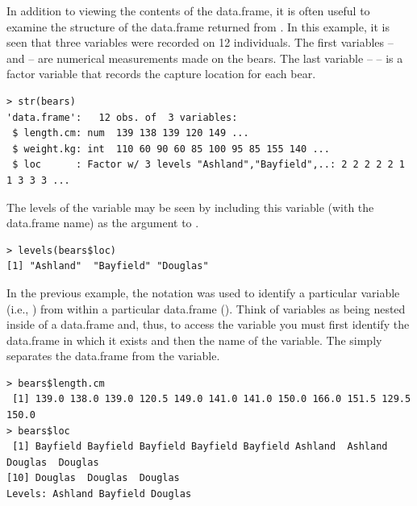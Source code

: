 \documentclass[10pt,openany]{book}\usepackage[]{graphicx}\usepackage[]{color}
\makeatletter
\newenvironment{kframe}{%
 \def\at@end@of@kframe{}%
 \ifinner\ifhmode%
  \def\at@end@of@kframe{\end{minipage}}%
  \begin{minipage}{\columnwidth}%
 \fi\fi%
 \def\FrameCommand##1{\hskip\@totalleftmargin \hskip-\fboxsep
 \colorbox{shadecolor}{##1}\hskip-\fboxsep
     \hskip-\linewidth \hskip-\@totalleftmargin \hskip\columnwidth}%
 \MakeFramed {\advance\hsize-\width
   \@totalleftmargin\z@ \linewidth\hsize
   \@setminipage}}%
 {\par\unskip\endMakeFramed%
 \at@end@of@kframe}
\newenvironment{knitrout}{}{} %
\makeatother
\begin{document}
In addition to viewing the contents of the data.frame, it is often useful to examine the structure of the data.frame returned from .  In this example, it is seen that three variables were recorded on 12 individuals.  The first variables --  and  -- are numerical measurements made on the bears.  The last variable --  -- is a factor variable that records the capture location for each bear.
\begin{knitrout}
\color{fgcolor}\begin{kframe}
\begin{verbatim}
> str(bears)
'data.frame':	12 obs. of  3 variables:
 $ length.cm: num  139 138 139 120 149 ...
 $ weight.kg: int  110 60 90 60 85 100 95 85 155 140 ...
 $ loc      : Factor w/ 3 levels "Ashland","Bayfield",..: 2 2 2 2 2 1 1 3 3 3 ...
\end{verbatim}
\end{kframe}
\end{knitrout}
The levels of the  variable may be seen by including this variable (with the data.frame name) as the argument to .
\begin{knitrout}
\color{fgcolor}\begin{kframe}
\begin{verbatim}
> levels(bears$loc)
[1] "Ashland"  "Bayfield" "Douglas" 
\end{verbatim}
\end{kframe}
\end{knitrout}

In the previous example, the \R{\$} notation was used to identify a particular variable (i.e., ) from within a particular data.frame ().  Think of variables as being nested inside of a data.frame and, thus, to access the variable you must first identify the data.frame in which it exists and then the name of the variable.  The \R{\$} simply separates the data.frame from the variable.
\begin{knitrout}
\color{fgcolor}\begin{kframe}
\begin{verbatim}
> bears$length.cm
 [1] 139.0 138.0 139.0 120.5 149.0 141.0 141.0 150.0 166.0 151.5 129.5 150.0
> bears$loc
 [1] Bayfield Bayfield Bayfield Bayfield Bayfield Ashland  Ashland  Douglas  Douglas 
[10] Douglas  Douglas  Douglas 
Levels: Ashland Bayfield Douglas
\end{verbatim}
\end{kframe}
\end{knitrout}
\end{document}
